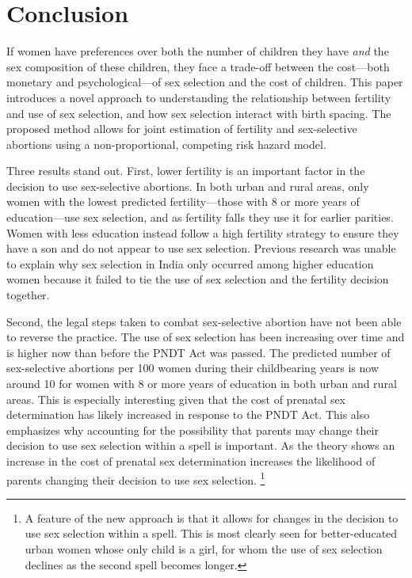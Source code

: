 \documentclass[12pt,letterpaper]{article}
\begin{document}
\section{Conclusion\label{sec:conclusion}}


If women have preferences over both the number of children they have \emph{and} the sex 
composition of these children, they face a trade-off between the cost---both monetary 
and psychological---of sex selection and the cost of children.
This paper introduces a novel approach to understanding the relationship between
fertility and use of sex selection, and how sex selection interact with birth spacing.
The proposed method allows for joint estimation of fertility and sex-selective abortions 
using a non-proportional, competing risk hazard model.

Three results stand out.
First, lower fertility is an important factor in the decision to use sex-selective abortions.
In both urban and rural areas, only women with the lowest predicted fertility---those
with 8 or more years of education---use sex selection, and as fertility falls they use it 
for earlier parities.
Women with less education instead follow a high fertility strategy to ensure they have
a son and do not appear to use sex selection.
Previous research was unable to explain why sex selection in India only occurred 
among higher education women because it failed to tie the use of sex selection and the 
fertility decision together.

Second, the legal steps taken to combat sex-selective abortion have not been able
to reverse the practice.
The use of sex selection has been increasing over time and is higher now than before the
PNDT Act was passed.
The predicted number of sex-selective abortions per 100 women during their childbearing 
years is now around 10 for women with 8 or more years of education in both urban and
rural areas.
This is especially interesting given that the cost of prenatal sex determination 
has likely increased in response to the PNDT Act.
This also emphasizes why accounting for the possibility that parents may change
their decision to use sex selection within a spell is important. 
As the theory shows an increase in the cost of prenatal sex determination 
increases the likelihood of parents changing their decision to use sex selection.%
\footnote{
A feature of the new approach is that it allows for changes in the decision 
to use sex selection within a spell.
This is most clearly seen for better-educated urban women whose only child is a girl, 
for whom the use of sex selection declines as the second spell becomes longer.
}
\end{document}
